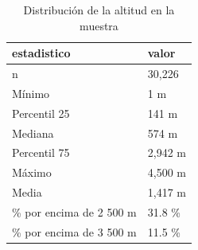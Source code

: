 \begin{table}[htbp]
\caption{Distribución de la altitud en la muestra}
\label{tab:tabla_32_descripcion_altitud}
\begin{tabular}{ll}
\toprule
estadistico & valor \\
\midrule
n & 30,226 \\
Mínimo & 1 m \\
Percentil 25 & 141 m \\
Mediana & 574 m \\
Percentil 75 & 2,942 m \\
Máximo & 4,500 m \\
Media & 1,417 m \\
\% por encima de 2 500 m & 31.8 \% \\
\% por encima de 3 500 m & 11.5 \% \\
\bottomrule
\end{tabular}
\end{table}
